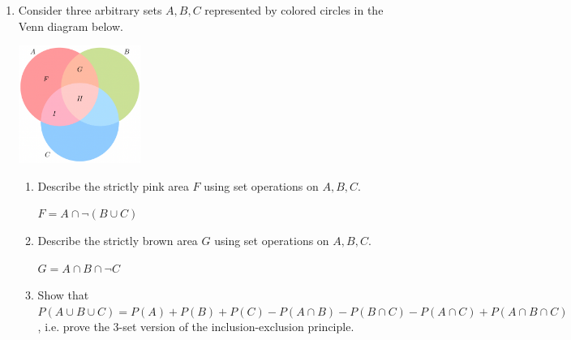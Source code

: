 \documentclass[11pt]{article}
\begin{document}
\begin{enumerate}
		\item Consider three arbitrary sets $ A, B, C $ represented by colored circles in the Venn diagram below.
			\begin{mdframed}[default, userdefinedwidth=4.8cm]
				\includegraphics[width=4cm]{venn_pic.png}
			\end{mdframed}
			\begin{enumerate}
				\item Describe the strictly pink area $ F $ using set operations on $ A, B, C $.
					\begin{mdframed}
						$ F = A \cap \neg (B \cup C) $
					\end{mdframed}
				\item Describe the strictly brown area $ G $ using set operations on $ A, B, C $.
					\begin{mdframed}
						$ G = A \cap B \cap \neg C $
					\end{mdframed}
				\newpage
				\item Show that $ P(A \cup B \cup C)=P(A)+P(B)+P(C) - P(A \cap B) - P(B \cap C) - P(A \cap C)+ P (A \cap B \cap C ) $, i.e. prove the 3-set version of the inclusion-exclusion principle.
					\begin{mdframed}

\end{mdframed}
\end{enumerate}
\end{enumerate}
\end{document}
